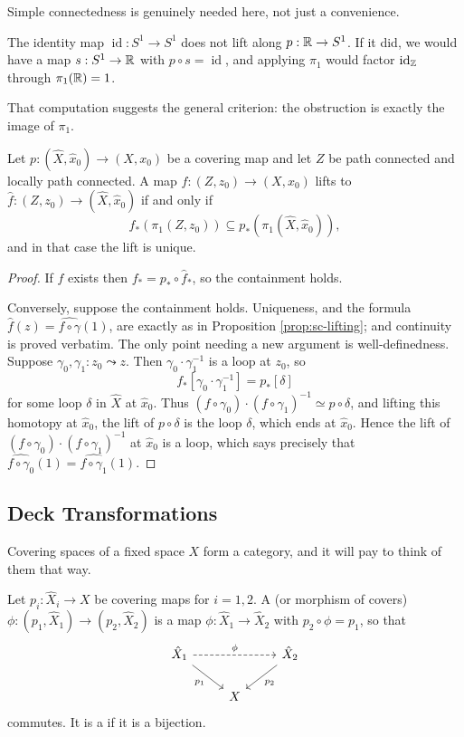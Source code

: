 \documentclass[a4paper]{scrartcl}
\newcommand{\id}{\operatorname{id}}
\begin{document}
Simple connectedness is genuinely needed here, not just a convenience.

\begin{example}
	The identity map $\id: S^1 \to S^1$ does not lift along $p: \mathbb{R} \to S^1$. If it did, we would have a map $s: S^1 \to \mathbb{R}$ with $p \circ s = \id$, and applying $\pi_1$ would factor $\id_\Z$ through $\pi_1(\mathbb{R}) = 1$.
\end{example}

That computation suggests the general criterion: the obstruction is exactly the image of
$\pi_1$.

\begin{theorem} \label{thm:lifting-criterion}
	Let $p: (\hat X, \hat x_0) \to (X, x_0)$ be a covering map and let $Z$ be path connected and locally path connected. A map $f: (Z, z_0) \to (X, x_0)$ lifts to $\hat f: (Z, z_0) \to (\hat X, \hat x_0)$ if and only if
	$$
	f_*(\pi_1(Z, z_0)) \subseteq p_*(\pi_1(\hat X, \hat x_0)),
	$$
	and in that case the lift is unique.
\end{theorem}
\begin{proof}
	If $\hat f$ exists then $f_* = p_* \circ \hat f_*$, so the containment holds.

	Conversely, suppose the containment holds. Uniqueness, and the formula $\hat f(z) = \widehat{f\circ\gamma}(1)$, are exactly as in Proposition \ref{prop:sc-lifting}; and continuity is proved verbatim. The only point needing a new argument is well-definedness. Suppose $\gamma_0, \gamma_1: z_0 \leadsto z$. Then $\gamma_0\cdot\gamma_1^{-1}$ is a loop at $z_0$, so
	$$
	f_*[\gamma_0\cdot\gamma_1^{-1}] = p_*[\delta]
	$$
	for some loop $\delta$ in $\hat X$ at $\hat x_0$. Thus $(f\circ\gamma_0)\cdot(f\circ\gamma_1)^{-1} \simeq p \circ \delta$, and lifting this homotopy at $\hat x_0$, the lift of $p \circ \delta$ is the loop $\delta$, which ends at $\hat x_0$. Hence the lift of $(f\circ\gamma_0)\cdot(f\circ\gamma_1)^{-1}$ at $\hat x_0$ is a loop, which says precisely that $\widehat{f\circ\gamma_0}(1) = \widehat{f\circ\gamma_1}(1)$.
\end{proof}

\subsection{Deck Transformations}

Covering spaces of a fixed space $X$ form a category, and it will pay to think of them
that way.

\begin{definition}
	Let $p_i: \hat X_i \to X$ be covering maps for $i = 1,2$. A  (or morphism of covers) $\phi: (p_1, \hat X_1) \to (p_2, \hat X_2)$ is a map $\phi: \hat X_1 \to \hat X_2$ with $p_2 \circ \phi = p_1$, so that
	\[\begin{tikzcd}
		{\hat X_1} \arrow[rr, "\phi", dashed] \arrow[rd, "{p_1}"'] & & {\hat X_2} \arrow[ld, "{p_2}"] \\
		& X &
	\end{tikzcd}\]
	commutes. It is a  if it is a bijection.
\end{definition}
\end{document}
